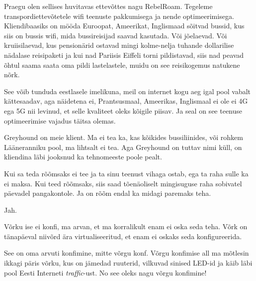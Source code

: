 
Praegu olen sellises huvitavas ettevõttes nagu RebelRoam. 
Tegeleme transpordiettevõtetele wifi teenuste pakkumisega ja nende 
optimeerimisega. Kliendibaasiks on mööda Euroopat, Ameerikat, Inglismaad 
sõitvad bussid, kus siis on bussis wifi, mida  bussireisijad saavad kasutada. 
Või jõelaevad. Või kruiisilaevad, kus pensionärid ostavad mingi kolme-nelja 
tuhande dollarilise nädalase reisipaketi ja kui nad Pariisis Eiffeli torni 
pildistavad, siis nad peavad õhtul saama saata oma pildi lastelastele, muidu on 
see reisikogemus natukene nõrk. 

See võib tunduda  eestlasele imelikuna, meil on internet kogu aeg igal pool 
vabalt kättesaadav, aga näidetena ei, Prantsusmaal, Ameerikas, Inglismaal ei 
ole ei 4G ega 5G nii levinud, et selle kvaliteet oleks kõigile piisav. Ja seal 
on see teenuse optimeerimise vajadus täitsa olemas.


Greyhound on meie klient. Ma ei tea ka, kas kõikides bussiliinides, või rohkem 
Lääneranniku pool, ma lihtsalt ei tea. Aga Greyhound on tuttav nimi küll,  on 
kliendina läbi jooksnud ka tehnomeeste poole pealt.


Kui sa teda rõõmsaks ei tee ja ta sinu teenust vihaga ostab, ega  ta raha sulle 
ka ei maksa. Kui teed rõõmsaks, siis saad tõenäoliselt mingisuguse raha 
sobivatel päevadel pangakontole. Ja on rõõm endal ka midagi paremaks teha.


Jah.


Võrku ise ei konfi, ma arvan, et ma korralikult enam ei oska seda teha. Võrk on 
tänapäeval  niivõrd ära virtualiseeritud, et enam ei oskaks seda konfigureerida.


See on oma arvuti konfimine, mitte võrgu konf. Võrgu konfimise all ma mõtlesin 
ikkagi päris võrku, kus on jämedad ruuterid, vilkuvad sinised LED-id ja käib 
läbi pool Eesti Interneti \emph{traffic}-ust. No see oleks nagu võrgu 
konfimine! 

